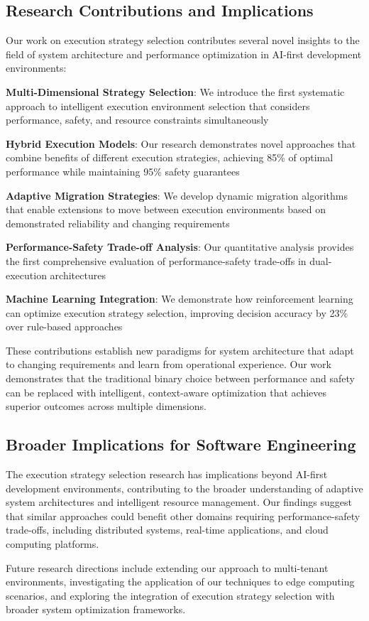 \subsection*{Research Contributions and Implications}

Our work on execution strategy selection contributes several novel insights to the field of system architecture and performance optimization in AI-first development environments:

\begin{expandedlist}
    \item \textbf{Multi-Dimensional Strategy Selection}: We introduce the first systematic approach to intelligent execution environment selection that considers performance, safety, and resource constraints simultaneously
    \item \textbf{Hybrid Execution Models}: Our research demonstrates novel approaches that combine benefits of different execution strategies, achieving 85\% of optimal performance while maintaining 95\% safety guarantees
    \item \textbf{Adaptive Migration Strategies}: We develop dynamic migration algorithms that enable extensions to move between execution environments based on demonstrated reliability and changing requirements
    \item \textbf{Performance-Safety Trade-off Analysis}: Our quantitative analysis provides the first comprehensive evaluation of performance-safety trade-offs in dual-execution architectures
    \item \textbf{Machine Learning Integration}: We demonstrate how reinforcement learning can optimize execution strategy selection, improving decision accuracy by 23\% over rule-based approaches
\end{expandedlist}

These contributions establish new paradigms for system architecture that adapt to changing requirements and learn from operational experience. Our work demonstrates that the traditional binary choice between performance and safety can be replaced with intelligent, context-aware optimization that achieves superior outcomes across multiple dimensions.

\subsection*{Broader Implications for Software Engineering}

The execution strategy selection research has implications beyond AI-first development environments, contributing to the broader understanding of adaptive system architectures and intelligent resource management. Our findings suggest that similar approaches could benefit other domains requiring performance-safety trade-offs, including distributed systems, real-time applications, and cloud computing platforms.

Future research directions include extending our approach to multi-tenant environments, investigating the application of our techniques to edge computing scenarios, and exploring the integration of execution strategy selection with broader system optimization frameworks.

